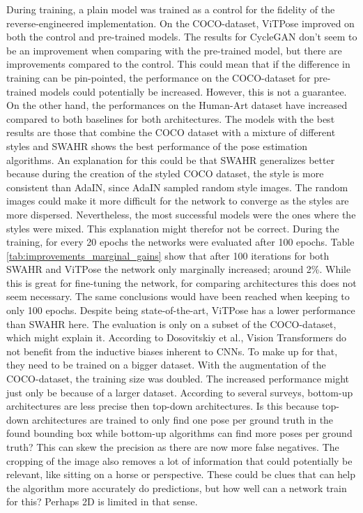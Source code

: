 During training, a plain model was trained as a control for the fidelity of the reverse-engineered implementation.
On the COCO-dataset, ViTPose improved on both the control and pre-trained models.
The results for CycleGAN don't seem to be an improvement when comparing with the pre-trained model, but there are improvements compared to the control.
This could mean that if the difference in training can be pin-pointed, the performance on the COCO-dataset for pre-trained models could potentially be increased.
However, this is not a guarantee.
On the other hand, the performances on the Human-Art dataset have increased compared to both baselines for both architectures.
The models with the best results are those that combine the COCO dataset with a mixture of different styles and SWAHR shows the best performance of the pose estimation algorithms.
An explanation for this could be that SWAHR generalizes better because during the creation of the styled COCO dataset, the style is more consistent than AdaIN, since AdaIN sampled random style images.
The random images could make it more difficult for the network to converge as the styles are more dispersed.
Nevertheless, the most successful models were the ones where the styles were mixed.
This explanation might therefor not be correct.
During the training, for every 20 epochs the networks were evaluated after 100 epochs.
Table \ref{tab:improvements_marginal_gains} show that after 100 iterations for both SWAHR and ViTPose the network only marginally increased; around 2\%.
While this is great for fine-tuning the network, for comparing architectures this does not seem necessary.
The same conclusions would have been reached when keeping to only 100 epochs.
Despite being state-of-the-art, ViTPose has a lower performance than SWAHR here.
The evaluation is only on a subset of the COCO-dataset, which might explain it.
According to Dosovitskiy et al., \cite{Dosovitskiy2020} Vision Transformers do not benefit from the inductive biases inherent to CNNs.
To make up for that, they need to be trained on a bigger dataset.
With the augmentation of the COCO-dataset, the training size was doubled.
The increased performance might just only be because of a larger dataset.
According to several surveys, bottom-up architectures are less precise then top-down architectures.
Is this because top-down architectures are trained to only find one pose per ground truth in the found bounding box while bottom-up algorithms can find more poses per ground truth?
This can skew the precision as there are now more false negatives.
The cropping of the image also removes a lot of information that could potentially be relevant, like sitting on a horse or perspective.
These could be clues that can help the algorithm more accurately do predictions, but how well can a network train for this? Perhaps 2D is limited in that sense.


